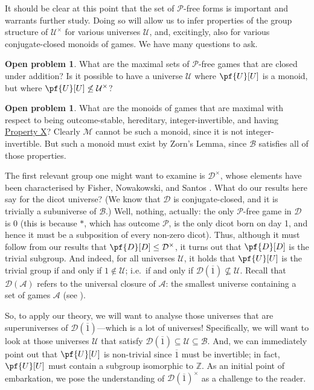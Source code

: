\documentclass[11pt]{article}
\theoremstyle{definition}
\newtheorem{problem}[theorem]{Open problem}
\newcommand{\set}[1]{\mathcal{#1}}
\begin{document}
It should be clear at this point that the set of $\mathscr{P}$-free forms is
important and warrants further study. Doing so will allow us to infer
properties of the group structure of $\set{U}^\times$ for various universes
$\set{U}$, and, excitingly, also for various conjugate-closed monoids of games.
We have many questions to ask.

\begin{problem}
    What are the maximal sets of $\mathscr{P}$-free games that are closed under
    addition? Is it possible to have a universe $\set{U}$ where $\pf{U}[U]$ is
    a monoid, but where $\pf{U}[U]\not\leq\set{U}^\times$?
\end{problem}

\begin{problem}
    What are the monoids of games that are maximal with respect to being
    outcome-stable, hereditary, integer-invertible, and having
    \hyperlink{prop:X}{Property X}? Clearly $\set{M}$ cannot be such a monoid,
    since it is not integer-invertible. But such a monoid must exist by Zorn's
    Lemma, since $\set{B}$ satisfies all of those properties.
\end{problem}

The first relevant group one might want to examine is $\set{D}^\times$, whose
elements have been characterised by Fisher, Nowakowski, and Santos
\cite[Theorem 12 on p.~7]{fisher.nowakowski.ea:invertible}. What do our results
here say for the dicot universe? (We know that $\set{D}$ is conjugate-closed,
and it is trivially a subuniverse of $\set{B}$.) Well, nothing, actually: the
only $\mathscr{P}$-free game in $\set{D}$ is 0 (this is because $*$, which has
outcome $\mathscr{P}$, is the only dicot born on day 1, and hence it must be a
subposition of every non-zero dicot). Thus, although it must follow from our
results that $\pf{D}[D]\leq \set{D}^\times$, it turns out that $\pf{D}[D]$ is
the trivial subgroup. And indeed, for all universes $\set{U}$, it holds that
$\pf{U}[U]$ is the trivial group if and only if $1\notin\set{U}$; i.e.\ if and
only if $\set{D}(\overline{1})\not\subseteq\set{U}$. Recall that
$\set{D}(\set{A})$ refers to the universal closure of $\set{A}$: the smallest
universe containing a set of games $\set{A}$ (see
\cite[pp.~195--196]{siegel:on}).

So, to apply our theory, we will want to analyse those universes that are
superuniverses of $\set{D}(\overline{1})$---which is a lot of universes!
Specifically, we will want to look at those universes $\set{U}$ that satisfy
$\set{D}(\overline{1})\subseteq\set{U}\subseteq\set{B}$. And, we can
immediately point out that $\pf{U}[U]$ is non-trivial since $\overline{1}$ must
be invertible; in fact, $\pf{U}[U]$ must contain a subgroup isomorphic to
$\mathbb{Z}$. As an initial point of embarkation, we pose the understanding of
$\set{D}(\overline{1})^\times$ as a challenge to the reader.
\end{document}
